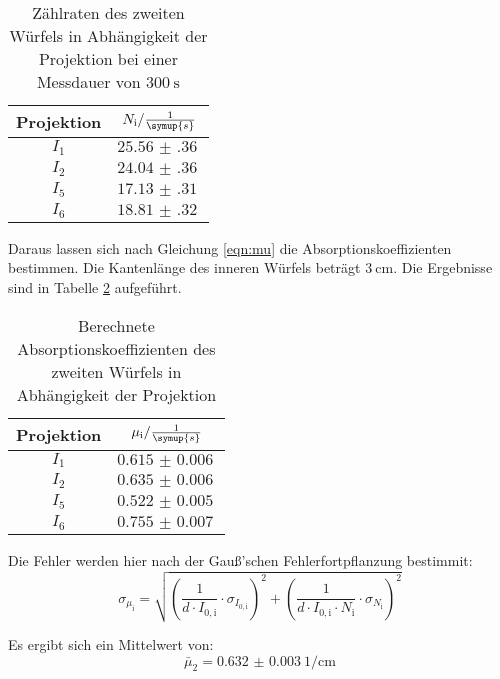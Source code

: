 \begin{table}[H]
  \centering
  \caption{Zählraten des zweiten Würfels in Abhängigkeit der Projektion bei einer Messdauer von $\SI{300}{\second}$ }
  \label{tab:w2}
  \begin{tabular}{c c}
    \toprule
    Projektion & $N_{\mathrm{i}} / \frac{1}{\symup{s}}$   \\
    \midrule
        $I_1$    & $\SI{25.56(36)}{}$ \\
        $I_2$    & $\SI{24.04(36)}{}$ \\
        $I_5$    & $\SI{17.13(31)}{}$ \\
        $I_6$    & $\SI{18.81(32)}{}$ \\
    \bottomrule
  \end{tabular}
\end{table}

Daraus lassen sich nach Gleichung \ref{eqn:mu} die Absorptionskoeffizienten bestimmen.
Die Kantenlänge des inneren Würfels beträgt $\SI{3}{\centi\meter}$.
Die Ergebnisse sind in Tabelle \ref{tab:mu2} aufgeführt.

\begin{table}[H]
  \centering
  \caption{Berechnete Absorptionskoeffizienten des zweiten Würfels in Abhängigkeit der Projektion}
  \label{tab:mu2}
  \begin{tabular}{c c}
    \toprule
    Projektion & $\mu_{\mathrm{i}} / \frac{1}{\symup{s}}$   \\
    \midrule
        $I_1$    & $\SI{0.615(6)}{}$ \\
        $I_2$    & $\SI{0.635(6)}{}$ \\
        $I_5$    & $\SI{0.522(5)}{}$ \\
        $I_6$    & $\SI{0.755(7)}{}$ \\
    \bottomrule
  \end{tabular}
\end{table}

Die Fehler werden hier nach der Gauß'schen Fehlerfortpflanzung bestimmit:
\begin{equation*}
  \sigma_{\mu_{\mathrm{i}}} = \sqrt{\left(\frac{1}{d\cdot I_{0,\mathrm{i}}} \cdot \sigma_{I_{0,\mathrm{i}}} \right)^2 + \left( \frac{1}{d\cdot I_{0,\mathrm{i}} \cdot N_{\mathrm{i}}}
  \cdot \sigma_{N_{\mathrm{i}}} \right)^2}
\end{equation*}

Es ergibt sich ein Mittelwert von:
\begin{equation*}
  \bar\mu_2 = \SI{0.632(3)}{1\per\centi\meter}
\end{equation*}



